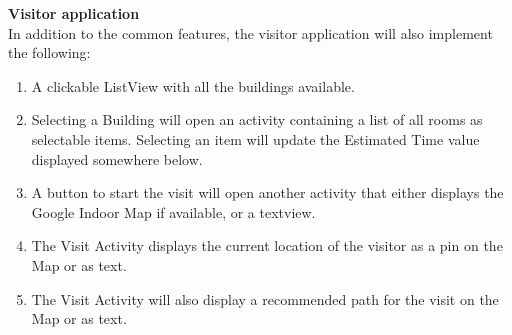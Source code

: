 \textbf{Visitor application}
\\
In addition to the common features, the visitor application will also implement the following:
\begin{enumerate}
\item A clickable ListView with all the buildings available.
\item Selecting a Building will open an activity containing a list of all rooms as selectable items. Selecting an item will update the Estimated Time value displayed somewhere below.
\item A button to start the visit will open another activity that either displays the Google Indoor Map if available, or a textview.
\item The Visit Activity displays the current location of the visitor as a pin on the Map or as text.
\item The Visit Activity will also display a recommended path for the visit on the Map or as text.
\end{enumerate}

